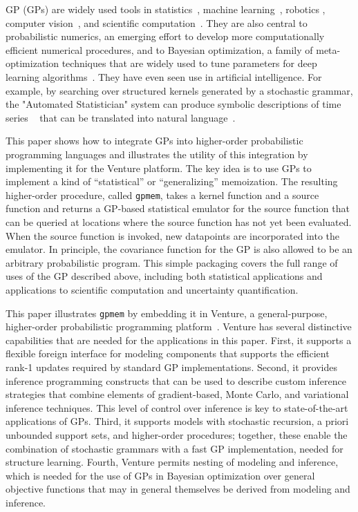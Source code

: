 \acl{GP} (GPs)  are widely used tools in statistics~\citep{barry1986nonparametric}, machine learning~\citep{neal1995bayesian,williams1998bayesian,kuss2005assessing,rasmussen2006gaussian,damianou2013deep}, robotics \citep{ferris2006gaussian}, computer vision~\citep{kemmler2013one}, and scientific computation~\citep{kennedy2001bayesian,schneider2008simulations,kwan2013cosmic}.
They are also central to probabilistic numerics, an emerging effort to develop more computationally efficient numerical procedures, and to Bayesian optimization, a family of meta-optimization techniques that are widely used to tune parameters for deep learning algorithms~\citep{snoek2012practical,gelbart2014bayesian}. 
They have even seen use in artificial intelligence. For example, by searching
over structured kernels generated by a stochastic grammar, the "Automated
Statistician" system can produce symbolic descriptions of time series
~\citep{duvenaud2013structure} that can be translated into natural
language~\citep{lloyd2014automatic}.



This paper shows how to integrate \acsp{GP} into higher-order
probabilistic programming languages and illustrates the utility of this
integration by implementing it for the Venture platform. The key idea is to use
GPs to implement a kind of “statistical” or “generalizing” memoization. The
resulting higher-order procedure, called {\tt gpmem}, takes a kernel function
and a source function and returns a GP-based statistical emulator for the source
function that can be queried at locations where the source function has not yet
been evaluated. When the source function is invoked, new datapoints are
incorporated into the emulator. In principle, the covariance function for the
GP is also allowed to be an arbitrary probabilistic program. This simple packaging covers the full range of uses of the GP described above, including both statistical applications and applications to scientific computation and uncertainty quantification.

This paper illustrates {\tt gpmem} by embedding it in Venture, a general-purpose, higher-order probabilistic programming platform~\citep{mansinghka2014venture}. Venture has several distinctive capabilities that are needed for the applications in this paper. First, it supports a flexible foreign interface for modeling components that supports the efficient rank-1 updates required by standard GP implementations. Second, it provides inference programming constructs that can be used to describe custom inference strategies that combine elements of gradient-based, Monte Carlo, and variational inference techniques. This level of control over inference is key to state-of-the-art applications of GPs. Third, it supports models with stochastic recursion, a priori unbounded support sets, and higher-order procedures; together, these enable the combination of stochastic grammars with a fast GP implementation, needed for structure learning. Fourth, Venture permits nesting of modeling and inference, which is needed for the use of GPs in Bayesian optimization over general objective functions that may in general themselves be derived from modeling and inference.

